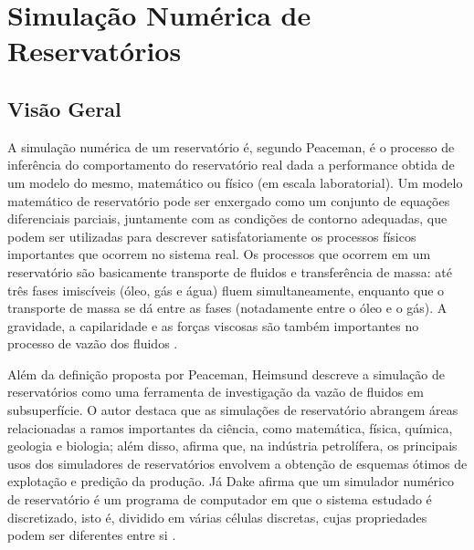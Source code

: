 
\section{Simula\c{c}\~{a}o Num\'{e}rica de Reservat\'{o}rios}
\subsection{Vis\~{a}o Geral}
A simula\c{c}\~{a}o num\'{e}rica de um reservat\'{o}rio \'{e}, segundo Peaceman, \'{e} o processo de infer\^{e}ncia do comportamento do reservat\'{o}rio real dada a performance obtida de um modelo do mesmo, matem\'{a}tico ou f\'{i}sico (em escala laboratorial). Um modelo matem\'{a}tico de reservat\'{o}rio pode ser enxergado como um conjunto de equa\c{c}\~{o}es diferenciais parciais, juntamente com as condi\c{c}\~{o}es de contorno adequadas, que podem ser utilizadas para descrever satisfatoriamente os processos f\'{i}sicos importantes que ocorrem no sistema real. Os processos que ocorrem em um reservat\'{o}rio s\~{a}o basicamente transporte de fluidos e transfer\^{e}ncia de massa: at\'{e} tr\^{e}s fases imisc\'{i}veis (\'{o}leo, g\'{a}s e \'{a}gua) fluem simultaneamente, enquanto que o transporte de massa se d\'{a} entre as fases (notadamente entre o \'{o}leo e o g\'{a}s). A gravidade, a capilaridade e as for\c{c}as viscosas s\~{a}o tamb\'{e}m importantes no processo de vaz\~{a}o dos fluidos \cite{simres}.

Al\'{e}m da defini\c{c}\~{a}o proposta por Peaceman, Heimsund descreve a simula\c{c}\~{a}o de reservat\'{o}rios como uma ferramenta de investiga\c{c}\~{a}o da vaz\~{a}o de fluidos em subsuperf\'{i}cie. O autor destaca que as simula\c{c}\~{o}es de reservat\'{o}rio abrangem \'{a}reas relacionadas a ramos importantes da ci\^{e}ncia, como matem\'{a}tica, f\'{i}sica, qu\'{i}mica, geologia e biologia; al\'{e}m disso, afirma que, na ind\'{u}stria petrol\'{i}fera, os principais usos dos simuladores de reservat\'{o}rios envolvem a obten\c{c}\~{a}o de esquemas \'{o}timos de explota\c{c}\~{a}o e predi\c{c}\~{a}o da produ\c{c}\~{a}o\cite{heimsund2005}. J\'{a} Dake afirma que um simulador num\'{e}rico de reservat\'{o}rio \'{e} um programa de computador em que o sistema estudado \'{e} discretizado, isto \'{e}, dividido em v\'{a}rias c\'{e}lulas discretas, cujas propriedades podem ser diferentes entre si \cite{dake}.

